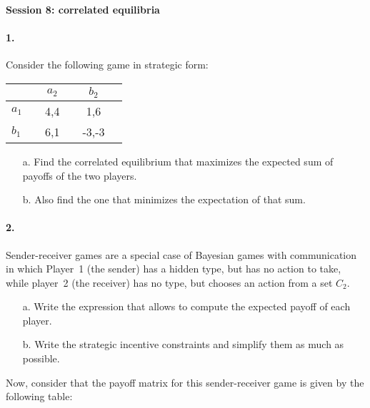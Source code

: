 \documentclass[a4paper,notitlepage,12pt]{article}
\begin{document}
\setlength{\parindent}{0pt}
\setlength{\parskip}{1ex plus 0.5ex minus 0.2ex}

\large

\textbf{Session 8: correlated equilibria}


\paragraph{1. } Consider the following game in strategic form:

	\begin{center}
		\begin{tabular}[h!]{l|ccccc}
			&& $a_2$ && $b_2$ & \\
			\hline
			$a_1$ && 4,4 && 1,6 & \\
			$b_1$ && 6,1 && -3,-3 & 
		\end{tabular} 
	\end{center}

\begin{enumerate}
	\item[a.] Find the correlated equilibrium that maximizes the expected sum of payoffs of the two players.
	\item[b.] Also find the one that minimizes the expectation of that sum.
\end{enumerate}

\paragraph{2. } Sender-receiver games are a special case of Bayesian games with communication in which Player~1 (the sender) has a hidden type, but has no action to take, while player~2 (the receiver) has no type, but chooses an action from a set $C_2$.

\begin{enumerate}
	\item[a.] Write the expression that allows to compute the expected payoff of each player.
	\item[b.] Write the strategic incentive constraints and simplify them as much as possible.
\end{enumerate}

Now, consider that the payoff matrix for this sender-receiver game is given by the following table:
\end{document}
